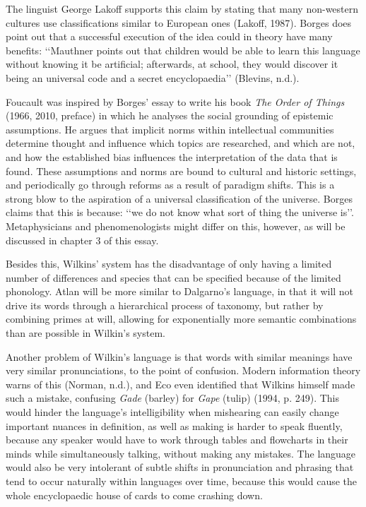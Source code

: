 The linguist George Lakoff supports this claim by stating that many non-western cultures use classifications similar to European ones (Lakoff, 1987). Borges does point out that a successful execution of the idea could in theory have many benefits: ‘‘Mauthner points out that children would be able to learn this language without knowing it be artificial; afterwards, at school, they would discover it being an universal code and a secret encyclopaedia’’ (Blevins, n.d.). 

Foucault was inspired by Borges’ essay to write his book \textit{The Order of Things} (1966, 2010, preface) in which he analyses the social grounding of epistemic assumptions. He argues that implicit norms within intellectual communities determine thought and influence which topics are researched, and which are not, and how the established bias influences the interpretation of the data that is found. These assumptions and norms are bound to cultural and historic settings, and periodically go through reforms as a result of paradigm shifts. This is a strong blow to the aspiration of a universal classification of the universe. Borges claims that this is because: ‘‘we do not know what sort of thing the universe is’’. Metaphysicians and phenomenologists might differ on this, however, as will be discussed in chapter 3 of this essay.  

Besides this, Wilkins’ system has the disadvantage of only having a limited number of differences and species that can be specified because of the limited phonology. Atlan will be more similar to Dalgarno’s language, in that it will not drive its words through a hierarchical process of taxonomy, but rather by combining primes at will, allowing for exponentially more semantic combinations than are possible in Wilkin’s system. 

Another problem of Wilkin’s language is that words with similar meanings have very similar pronunciations, to the point of confusion. Modern information theory warns of this (Norman, n.d.), and Eco even identified that Wilkins himself made such a mistake, confusing {\it Gade} (barley) for {\it Gape} (tulip) (1994, p. 249). This would hinder the language’s intelligibility when mishearing can easily change important nuances in definition, as well as making is harder to speak fluently, because any speaker would have to work through tables and flowcharts in their minds while simultaneously talking, without making any mistakes. The language would also be very intolerant of subtle shifts in pronunciation and phrasing that tend to occur naturally within languages over time, because this would cause the whole encyclopaedic house of cards to come crashing down. 

